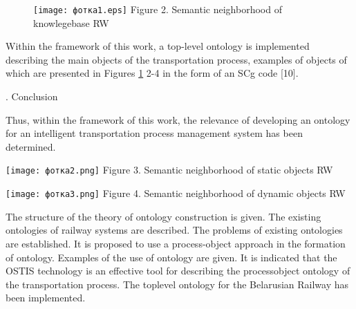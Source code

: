 \documentclass[a4paper]{article}
\begin{document}
\begin{multicols}{2}
\begin{figure}
\texttt{[image: фотка1.eps]}
{Figure 2. Semantic neighborhood of knowlegebase RW }
\label{fig:фотка1}
\end{figure}

\par\quad Within the framework of this work, a top-level ontology is implemented describing the main objects of the
transportation process, examples of objects of which are
presented in Figures \ref{fig:фотка1} 2-4 in the form of an SCg code [10].

\begin{center}
\MakeUppercase {}. Conclusion
\end{center}

\par Thus, within the framework of this work, the relevance
of developing an ontology for an intelligent transportation process management system has been determined.

\texttt{[image: фотка2.png]}
{Figure 3. Semantic neighborhood of static objects RW}


\texttt{[image: фотка3.png]}
{Figure 4. Semantic neighborhood of dynamic objects RW}

\par The structure of the theory of ontology construction
is given. The existing ontologies of railway systems
are described. The problems of existing ontologies are
established. It is proposed to use a process-object approach in the formation of ontology. Examples of the
use of ontology are given. It is indicated that the OSTIS
technology is an effective tool for describing the processobject ontology of the transportation process. The toplevel ontology for the Belarusian Railway has been implemented.
 

\end{multicols}
\end{document}

